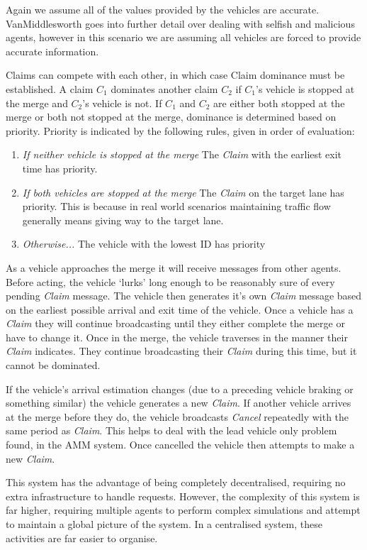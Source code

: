 Again we assume all of the values provided by the vehicles are accurate. VanMiddlesworth \citep{VanMiddlesworth2008} goes into further detail over dealing with selfish and malicious agents, however in this scenario we are assuming all vehicles are forced to provide accurate information.

Claims can compete with each other, in which case Claim dominance must be established. A claim $C_1$ dominates another claim $C_2$ if $C_1$'s vehicle is stopped at the merge and $C_2$'s vehicle is not. If $C_1$ and $C_2$ are either both stopped at the merge or both not stopped at the merge, dominance is determined based on priority. Priority is indicated by the following rules, given in order of evaluation:

\begin{enumerate}
\item \emph{If neither vehicle is stopped at the merge} The \emph{Claim} with the earliest exit time has priority.
\item \emph{If both vehicles are stopped at the merge} The \emph{Claim} on the target lane has priority. This is because in real world scenarios maintaining traffic flow generally means giving way to the target lane.
\item \emph{Otherwise...} The vehicle with the lowest ID has priority
\end{enumerate}

As a vehicle approaches the merge it will receive messages from other agents. Before acting, the vehicle `lurks' long enough to be reasonably sure of every pending \emph{Claim} message. The vehicle then generates it's own \emph{Claim} message based on the earliest possible arrival and exit time of the vehicle. Once a vehicle has a \emph{Claim} they will continue broadcasting until they either complete the merge or have to change it. Once in the merge, the vehicle traverses in the manner their \emph{Claim} indicates. They continue broadcasting their \emph{Claim} during this time, but it cannot be dominated. 

If the vehicle's arrival estimation changes (due to a preceding vehicle braking or something similar) the vehicle generates a new \emph{Claim}. If another vehicle arrives at the merge before they do, the vehicle broadcasts \emph{Cancel} repeatedly with the same period as \emph{Claim}. This helps to deal with the lead vehicle only problem found, in the AMM system. Once cancelled the vehicle then attempts to make a new \emph{Claim}.

This system has the advantage of being completely decentralised, requiring no extra infrastructure to handle requests. However, the complexity of this system is far higher, requiring multiple agents to perform complex simulations and attempt to maintain a global picture of the system. In a centralised system, these activities are far easier to organise.